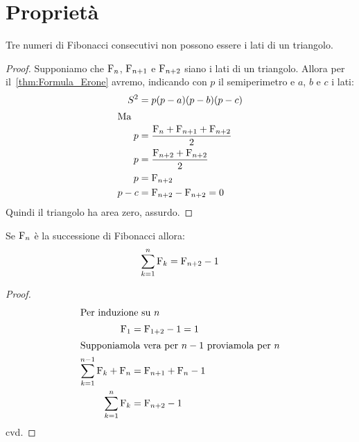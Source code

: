 \section{Proprietà}
\begin{thm}
	Tre numeri di Fibonacci consecutivi non possono essere i lati di un 
	triangolo.
\end{thm}
\begin{proof}
	Supponiamo che $\mathrm{F}_{n}$, $\mathrm{F}_{n+1}$ e $\mathrm{F}_{n+2}$ siano i lati di un 
	triangolo. Allora per il~\vref{thm:Formula_Erone} avremo, indicando con $p$ 
	il semiperimetro e $a$, $b$ e $c$ i lati:
	\begin{align*}
		S^2={}&p(p-a)(p-b)(p-c)\\
		\intertext{Ma}
		p={}&\dfrac{\mathrm{F}_{n}+\mathrm{F}_{n+1}+\mathrm{F}_{n+2}}{2}\\
		p={}&\dfrac{\mathrm{F}_{n+2}+\mathrm{F}_{n+2}}{2}\\
		p={}&\mathrm{F}_{n+2}\\
		p-c={}&\mathrm{F}_{n+2}-\mathrm{F}_{n+2}=0\\
	\end{align*}
	Quindi il triangolo ha area zero, assurdo. 
\end{proof}
\begin{thm}
	Se $\mathrm{F}_{n}$ è la successione di Fibonacci allora:
	\begin{equation}
		\sum_{k=1}^{n}\mathrm{F}_{k}=\mathrm{F}_{n+2}-1
	\end{equation}\label{eqn:FibSommaNumeri}
\end{thm}
\begin{proof}
	\begin{align*}
		\intertext{Per induzione su $n$}
		\mathrm{F}_{1}={}&\mathrm{F}_{1+2}-1=1\\
		\intertext{Supponiamola vera per $n-1$ proviamola per $n$}
		\sum_{k=1}^{n-1}\mathrm{F}_{k}+\mathrm{F}_{n}={}&\mathrm{F}_{n+1}+\mathrm{F}_{n}-1\\
		\sum_{k=1}^{n}\mathrm{F}_{k}={}&\mathrm{F}_{n+2}-1\\
	\end{align*}
	cvd.
\end{proof}
